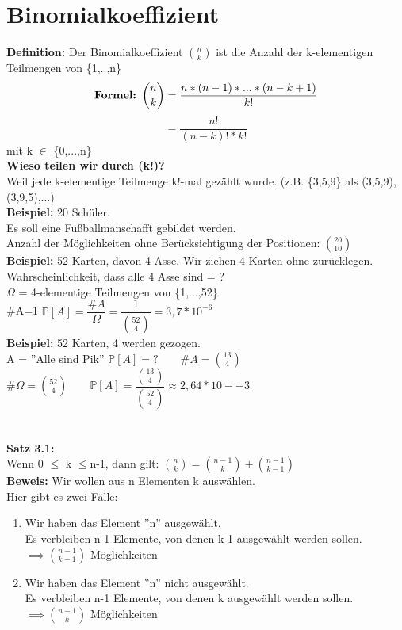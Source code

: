 \section{Binomialkoeffizient}
\textbf{Definition:}  Der Binomialkoeffizient $\binom{n}{k}$ ist die Anzahl der k-elementigen Teilmengen von \{1,..,n\}\medskip\\
$$\text{\textbf{Formel: }}\binom{n}{k}= \frac{n*(n-1)*...*(n-k+1)}{k!}$$
$$=\frac{n!}{(n-k)!*k!}$$ mit k $\in$ \{0,...,n\}\medskip\\
\textbf{ Wieso teilen wir durch (k!)?}\\
Weil jede k-elementige Teilmenge k!-mal gezählt wurde. (z.B. \{3,5,9\} als (3,5,9), (3,9,5),...)\medskip\\
\textbf{Beispiel:} 20 Schüler.\\Es soll eine Fußballmanschafft gebildet werden.\\
Anzahl der Möglichkeiten ohne Berücksichtigung der Positionen: $\binom{20}{10}$\medskip\\
\textbf{Beispiel:} 52 Karten, davon 4 Asse. Wir ziehen 4 Karten ohne zurücklegen. Wahrscheinlichkeit, dass alle 4 Asse sind = ?\\
$\Omega$ = 4-elementige Teilmengen von \{1,...,52\}\\
\#A=1 \hspace{1cm} $\mathds{P}[A]=\dfrac{\#A}{\Omega}=\dfrac{1}{\binom{52}{4}}=3,7*10^{-6}$\medskip\\
\textbf{Beispiel:} 52 Karten, 4 werden gezogen.\\
A = ''Alle sind Pik''
$\mathds{P}[A]= ? \qquad \#A=\binom{13}{4} $\\
\#$\Omega = \binom{52}{4} \qquad \mathds{P}[A] = \dfrac{\binom{13}{4}}{\binom{52}{4}} \approx 2,64*10-{-3} $\\\\\\
\textbf{Satz 3.1:}\\ Wenn 0 $\leq$ k $\leq$n-1, dann gilt:
$\binom{n}{k}=\binom{n-1}{k}+\binom{n-1}{k-1}$\medskip\\
\textbf{Beweis:} Wir wollen aus n Elementen k auswählen.\\
Hier gibt es zwei Fälle:
\begin{enumerate}
	\item Wir haben das Element ''n'' ausgewählt. \\ Es verbleiben n-1 Elemente, von denen k-1 ausgewählt werden sollen.\\ $\implies \binom{n-1}{k-1}$ Möglichkeiten
	\item Wir haben das Element ''n'' nicht ausgewählt.\\
	Es verbleiben n-1 Elemente, von denen k ausgewählt werden sollen.\\ $\implies \binom{n-1}{k}$ Möglichkeiten
\end{enumerate}
